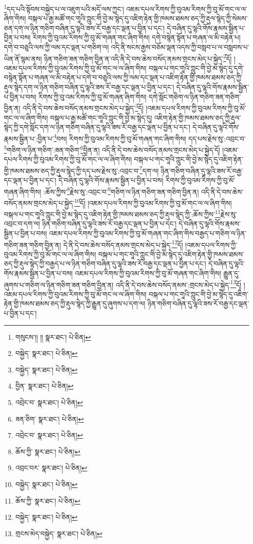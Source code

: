 \footnote{གསུངས་།། །།  སྣར་ཐང་།  པེ་ཅིན། }དད་པའི་སྟོབས་བསྐྱེད་པ་ལ་འཇུག་པའི་མདོ་ལས་ཀྱང་། འཇམ་དཔལ་རིགས་ཀྱི་བུའམ་རིགས་ཀྱི་བུ་མོ་གང་ལ་ལ་ཞིག་གིས། བསྐལ་པ་རྒྱ་མཚོ་གང་གཱའི་ཀླུང་གི་བྱེ་མ་སྙེད་དུ་འཇིག་རྟེན་གྱི་ཁམས་ཐམས་ཅད་ཀྱི་རྡུལ་སྙེད་ཀྱི་སེམས་ཅན་དག་ལ་ཉིན་གཅིག་བཞིན་དུ་ལྷའི་ཟས་རོ་བརྒྱ་དང་ལྡན་པ་བྱིན་པ་དང་། དེ་བཞིན་དུ་ལྷའི་གོས་རྣམས་སྦྱིན་པ་བྱིན་པ་བས། རིགས་ཀྱི་བུའམ་རིགས་ཀྱི་བུ་མོ་གཞན་གང་ཞིག་གིས། དགེ་བསྙེན་སྟོན་པ་གཞན་ལ་མི་བརྟེན་པ། དགེ་བ་བཅུའི་ལས་ཀྱི་ལམ་དང་ལྡན་པ་གཅིག་ལ། འདི་ནི་སངས་རྒྱས་བཅོམ་ལྡན་འདས་ཀྱི་བསླབ་པ་ལ་བསླབས་པ་ཡིན་ནོ་སྙམ་ནས། ཉིན་གཅིག་ཟན་གཅིག་བྱིན་ན་འདི་ནི་དེ་བས་ཆེས་བསོད་ནམས་གྲངས་མེད་པ་སྐྱེད་\footnote{བསྐྱེད་  སྣར་ཐང་།  པེ་ཅིན། }དོ། །འཇམ་དཔལ་རིགས་ཀྱི་བུའམ་རིགས་ཀྱི་བུ་མོ་གང་ལ་ལ་ཞིག་གིས། བསྐལ་པ་གང་གཱའི་ཀླུང་གི་བྱེ་མ་སྙེད་དུ་དགེ་བསྙེན་སྟོན་པ་གཞན་ལ་མི་བརྟེན་པ་དགེ་བ་བཅུའི་ལས་ཀྱི་ལམ་དང་ལྡན་པ་འཇིག་རྟེན་གྱི་ཁམས་ཐམས་ཅད་ཀྱི་རྡུལ་སྙེད་དག་ལ་ཉིན་གཅིག་བཞིན་དུ་ལྷའི་ཟས་རོ་བརྒྱ་དང་ལྡན་པ་བྱིན་པ་དང་། དེ་བཞིན་དུ་ལྷའི་གོས་རྣམས་སྦྱིན་པ་བྱིན་པ་བས། རིགས་ཀྱི་བུ་འམ་རིགས་ཀྱི་བུ་མོ་གཞན་ཞིག་གིས། དགེ་སློང་གཅིག་ལ་ཉིན་གཅིག་ཟན་གཅིག་བྱིན་ན། འདི་ནི་དེ་བས་ཆེས་བསོད་ནམས་གྲངས་མེད་པ་སྐྱེད་\footnote{བསྐྱེད་  སྣར་ཐང་།  པེ་ཅིན། }དོ། །འཇམ་དཔལ་རིགས་ཀྱི་བུའམ་རིགས་ཀྱི་བུ་མོ་གང་ལ་ལ་ཞིག་གིས། བསྐལ་པ་རྒྱ་མཚོ་གང་གཱའི་ཀླུང་གི་བྱེ་མ་སྙེད་དུ། འཇིག་རྟེན་གྱི་ཁམས་ཐམས་ཅད་ཀྱི་རྡུལ་སྙེད་ཀྱི་དགེ་སློང་དག་ལ་ཉིན་གཅིག་བཞིན་དུ་ལྷའི་ཟས་རོ་བརྒྱ་དང་ལྡན་པ་བྱིན་པ་དང་། དེ་བཞིན་དུ་ལྷའི་གོས་རྣམས་སྦྱིན་པ་:བྱིན་པ་\footnote{བྱིན་  སྣར་ཐང་།  པེ་ཅིན། }བས། རིགས་ཀྱི་བུའམ་རིགས་ཀྱི་བུ་མོ་གཞན་གང་ཞིག་གིས། དད་པས་རྗེས་སུ་:འབྲང་བ་\footnote{འབྲེང་བ་  སྣར་ཐང་།  པེ་ཅིན། }གཅིག་ལ་ཉིན་གཅིག་:ཟན་གཅིག་\footnote{ཟན་ཅིག་  སྣར་ཐང་།  པེ་ཅིན། }བྱིན་ན། འདི་ནི་དེ་བས་ཆེས་བསོད་ནམས་གྲངས་མེད་པ་སྐྱེད་དོ། །འཇམ་དཔལ་རིགས་ཀྱི་བུའམ་རིགས་ཀྱི་བུ་མོ་གང་ལ་ལ་ཞིག་གིས། བསྐལ་པ་གང་གཱའི་ཀླུང་གི་བྱེ་མ་སྙེད་དུ་འཇིག་རྟེན་གྱི་ཁམས་ཐམས་ཅད་ཀྱི་རྡུལ་སྙེད་ཀྱི་དད་པས་རྗེས་སུ་:འབྲང་བ་\footnote{འབྲེང་བ་  སྣར་ཐང་།  པེ་ཅིན། }དག་ལ། ཉིན་གཅིག་བཞིན་དུ་ལྷའི་ཟས་རོ་བརྒྱ་དང་ལྡན་པ་བྱིན་པ་དང་། དེ་བཞིན་དུ་ལྷའི་གོས་རྣམས་སྦྱིན་པ་བྱིན་པ་བས། རིགས་ཀྱི་བུའམ་རིགས་ཀྱི་བུ་མོ་གཞན་ཞིག་གིས། :ཆོས་ཀྱིས་\footnote{ཆོས་ཀྱི་  སྣར་ཐང་།  པེ་ཅིན། }རྗེས་སུ་:འབྲང་བ་\footnote{འབྲང་བར་  སྣར་ཐང་།  པེ་ཅིན། }གཅིག་ལ་ཉིན་གཅིག་ཟན་གཅིག་བྱིན་ན། འདི་ནི་དེ་བས་ཆེས་བསོད་ནམས་གྲངས་མེད་པ་སྐྱེད་\footnote{བསྐྱེད་  སྣར་ཐང་།  པེ་ཅིན། }དོ། །འཇམ་དཔལ་རིགས་ཀྱི་བུའམ་རིགས་ཀྱི་བུ་མོ་གང་ལ་ལ་ཞིག་གིས། བསྐལ་པ་གང་གཱའི་ཀླུང་གི་བྱེ་མ་སྙེད་དུ་འཇིག་རྟེན་གྱི་ཁམས་ཐམས་ཅད་ཀྱི་རྡུལ་སྙེད་ཀྱི་:ཆོས་ཀྱིས་\footnote{ཆོས་ཀྱི་  སྣར་ཐང་།  པེ་ཅིན། }རྗེས་སུ་འབྲང་བ་དག་ལ། ཉིན་གཅིག་བཞིན་དུ་ལྷའི་ཟས་རོ་བརྒྱ་དང་ལྡན་པ་བྱིན་པ་དང་། དེ་བཞིན་དུ་ལྷའི་གོས་རྣམས་སྦྱིན་པ་བྱིན་པ་བས། འཇམ་དཔལ་རིགས་ཀྱི་བུའམ་རིགས་ཀྱི་བུ་མོ་གཞན་གང་ཞིག་གིས་བརྒྱད་པ་གཅིག་ལ་ཉིན་གཅིག་ཟན་གཅིག་བྱིན་ན། དེ་ནི་དེ་བས་ཆེས་བསོད་ནམས་གྲངས་མེད་པ་སྐྱེད་\footnote{བསྐྱེད་  སྣར་ཐང་།  པེ་ཅིན། }དོ། །འཇམ་དཔལ་རིགས་ཀྱི་བུའམ་རིགས་ཀྱི་བུ་མོ་གང་ལ་ལ་ཞིག་གིས། བསྐལ་པ་གང་གཱའི་ཀླུང་གི་བྱེ་མ་སྙེད་དུ་འཇིག་རྟེན་གྱི་ཁམས་ཐམས་ཅད་ཀྱི་རྡུལ་སྙེད་ཀྱི་བརྒྱད་པ་ལ་ཉིན་གཅིག་བཞིན་དུ་ལྷའི་ཟས་རོ་བརྒྱ་དང་ལྡན་པ་བྱིན་པ་དང་། དེ་བཞིན་དུ་ལྷའི་གོས་རྣམས་སྦྱིན་པ་བྱིན་པ་བས། འཇམ་དཔལ་རིགས་ཀྱི་བུའམ་རིགས་ཀྱི་བུ་མོ་གཞན་གང་ཞིག་གིས། རྒྱུན་དུ་ཞུགས་པ་གཅིག་ལ་ཉིན་གཅིག་ཟན་གཅིག་བྱིན་ན། འདི་ནི་དེ་བས་ཆེས་བསོད་ནམས་:གྲངས་མེད་པ་སྐྱེད་\footnote{གྲངས་མེད་བསྐྱེད་  སྣར་ཐང་།  པེ་ཅིན། }དོ། །འཇམ་དཔལ་རིགས་ཀྱི་བུའམ་རིགས་ཀྱི་བུ་མོ་གང་ལ་ལ་ཞིག་གིས། བསྐལ་པ་གང་གཱའི་ཀླུང་གི་བྱེ་མ་སྙེད་དུ་འཇིག་རྟེན་གྱི་ཁམས་ཐམས་ཅད་ཀྱི་རྡུལ་སྙེད་ཀྱི་རྒྱུན་དུ་ཞུགས་པ་དག་ལ། ཉིན་གཅིག་བཞིན་དུ་ལྷའི་ཟས་རོ་བརྒྱ་དང་ལྡན་པ་བྱིན་པ་དང་། 
